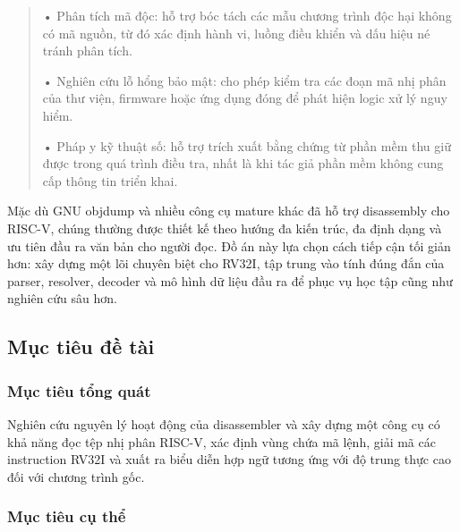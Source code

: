 \documentclass[
]{article}
\begin{document}
\begin{quote}
• Phân tích mã độc: hỗ trợ bóc tách các mẫu chương trình độc hại không
có mã nguồn, từ đó xác định hành vi, luồng điều khiển và dấu hiệu né
tránh phân tích.

• Nghiên cứu lỗ hổng bảo mật: cho phép kiểm tra các đoạn mã nhị phân của
thư viện, firmware hoặc ứng dụng đóng để phát hiện logic xử lý nguy
hiểm.

• Pháp y kỹ thuật số: hỗ trợ trích xuất bằng chứng từ phần mềm thu giữ
được trong quá trình điều tra, nhất là khi tác giả phần mềm không cung
cấp thông tin triển khai.
\end{quote}

Mặc dù GNU objdump và nhiều công cụ mature khác đã hỗ trợ disassembly
cho RISC-V, chúng thường được thiết kế theo hướng đa kiến trúc, đa định
dạng và ưu tiên đầu ra văn bản cho người đọc. Đồ án này lựa chọn cách
tiếp cận tối giản hơn: xây dựng một lõi chuyên biệt cho RV32I, tập trung
vào tính đúng đắn của parser, resolver, decoder và mô hình dữ liệu đầu
ra để phục vụ học tập cũng như nghiên cứu sâu hơn.

\hypertarget{mux1ee5c-tiuxeau-ux111ux1ec1-tuxe0i}{%
\subsection{\texorpdfstring{ Mục tiêu đề
tài}{ Mục tiêu đề tài}}\label{mux1ee5c-tiuxeau-ux111ux1ec1-tuxe0i}}

\hypertarget{mux1ee5c-tiuxeau-tux1ed5ng-quuxe1t}{%
\subsubsection{\texorpdfstring{ Mục tiêu tổng
quát}{ Mục tiêu tổng quát}}\label{mux1ee5c-tiuxeau-tux1ed5ng-quuxe1t}}

Nghiên cứu nguyên lý hoạt động của disassembler và xây dựng một công cụ
có khả năng đọc tệp nhị phân RISC-V, xác định vùng chứa mã lệnh, giải mã
các instruction RV32I và xuất ra biểu diễn hợp ngữ tương ứng với độ
trung thực cao đối với chương trình gốc.

\hypertarget{mux1ee5c-tiuxeau-cux1ee5-thux1ec3}{%
\subsubsection{\texorpdfstring{ Mục tiêu cụ
thể}{ Mục tiêu cụ thể}}\label{mux1ee5c-tiuxeau-cux1ee5-thux1ec3}}
\end{document}
